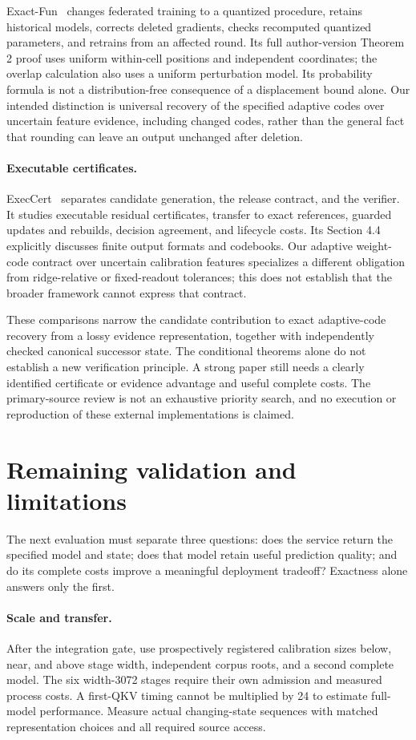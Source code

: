 \documentclass[10pt,twocolumn,letterpaper]{article}
\begin{document}
Exact-Fun~\cite{exactfun} changes federated training to a quantized procedure,
retains historical models, corrects deleted gradients, checks recomputed
quantized parameters, and retrains from an affected round. Its full author-version
Theorem 2 proof uses uniform within-cell positions and independent coordinates;
the overlap calculation also uses a uniform perturbation model. Its probability
formula is not a distribution-free consequence of a displacement bound alone.
Our intended distinction is universal recovery of the specified adaptive codes
over uncertain feature evidence, including changed codes, rather than the
general fact that rounding can leave an output unchanged after deletion.

\paragraph{Executable certificates.}
ExecCert~\cite{execcert} separates candidate generation, the release contract, and
the verifier. It studies executable residual certificates, transfer to exact
references, guarded updates and rebuilds, decision agreement, and lifecycle costs.
Its Section 4.4 explicitly discusses finite output formats and codebooks. Our
adaptive weight-code contract over uncertain calibration features specializes a
different obligation from ridge-relative or fixed-readout tolerances; this does
not establish that the broader framework cannot express that contract.

These comparisons narrow the candidate contribution to exact adaptive-code
recovery from a lossy evidence representation, together with independently
checked canonical successor state. The conditional theorems alone do not
establish a new verification principle. A strong paper still needs a clearly
identified certificate or evidence advantage and useful complete costs. The
primary-source review is not an exhaustive priority search, and no execution or
reproduction of these external implementations is claimed.

\section{Remaining validation and limitations}
The next evaluation must separate three questions: does the service return the
specified model and state; does that model retain useful prediction quality; and
do its complete costs improve a meaningful deployment tradeoff? Exactness alone
answers only the first.

\paragraph{Scale and transfer.}
After the integration gate, use prospectively registered calibration sizes below,
near, and above stage width, independent corpus roots, and a second complete model.
The six width-3072 stages require their own admission and measured process costs.
A first-QKV timing cannot be multiplied by 24 to estimate full-model performance.
Measure actual changing-state sequences with matched representation choices and
all required source access.
\end{document}
